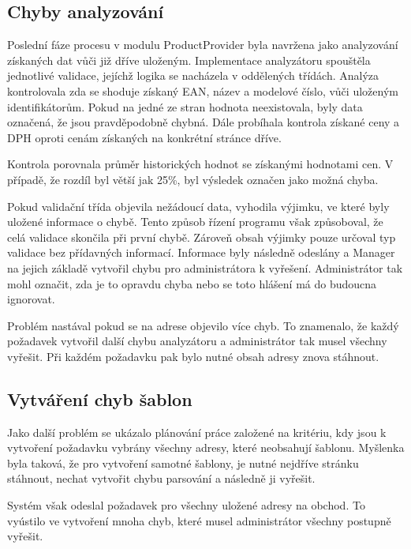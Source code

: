 \documentclass[thesis=B,czech]{FITthesis}[2012/06/26]
\begin{document}
\subsection{Chyby analyzování}
Poslední fáze procesu v modulu ProductProvider byla navržena jako analyzování získaných dat vůči již dříve uloženým. Implementace analyzátoru 
spouštěla jednotlivé validace, jejíchž logika se nacházela v oddělených třídách. 
Analýza kontrolovala zda se shoduje získaný EAN, název a modelové číslo, vůči uloženým identifikátorům. Pokud na jedné ze stran hodnota neexistovala, byly data označená, že jsou pravděpodobně chybná. Dále probíhala kontrola získané ceny  a  DPH oproti cenám získaných na konkrétní stránce dříve.
\par
Kontrola porovnala průměr historických hodnot se získanými hodnotami cen. V případě, že rozdíl byl větší jak 25\%, byl výsledek označen jako
možná chyba.
\par
Pokud validační třída objevila nežádoucí data,
vyhodila výjimku, ve které byly uložené informace o chybě. Tento způsob řízení programu však způsoboval, že celá validace skončila při první chybě.
Zároveň obsah výjimky pouze určoval typ validace bez přídavných informací.
Informace byly následně odeslány a Manager na jejich základě vytvořil chybu pro administrátora k vyřešení. Administrátor tak mohl 
označit, zda je to opravdu chyba nebo se toto hlášení má do budoucna ignorovat.
\par
Problém nastával pokud se na adrese objevilo více chyb. To znamenalo, že každý požadavek vytvořil další
chybu analyzátoru a administrátor tak musel všechny vyřešit. Při každém požadavku pak bylo nutné obsah adresy znova stáhnout.

\subsection{Vytváření chyb šablon}
Jako další problém se ukázalo plánování práce založené na kritériu, kdy jsou k vytvoření požadavku vybrány všechny adresy, které neobsahují šablonu.
Myšlenka byla taková, že pro vytvoření samotné šablony, je nutné nejdříve stránku stáhnout, nechat vytvořit chybu parsování
a následně ji vyřešit.
\par
Systém však odeslal požadavek pro všechny uložené adresy na obchod. To vyústilo ve vytvoření mnoha chyb, 
které musel administrátor všechny postupně vyřešit.
\par
\end{document}
